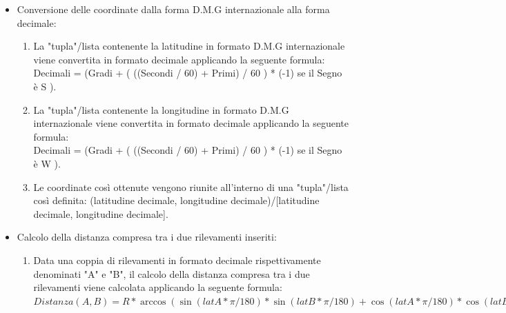 \documentclass{article}
\begin{document}
\begin{itemize}
	\item Conversione delle coordinate dalla forma D.M.G internazionale alla forma decimale:
	\begin{enumerate}
		\item La "tupla"/lista contenente la latitudine in formato D.M.G internazionale viene convertita in formato decimale applicando la seguente formula: \\Decimali = (Gradi + ( ((Secondi / 60) + Primi) / 60 ) * (-1) se il Segno è  S ). 
		\item La "tupla"/lista contenente la longitudine in formato D.M.G internazionale viene convertita in formato decimale applicando la seguente formula: \\Decimali = (Gradi + ( ((Secondi / 60) + Primi) / 60 ) * (-1) se il Segno è  W ).
		\item Le coordinate così ottenute vengono riunite all'interno di una "tupla"/lista così definita: (latitudine decimale, longitudine decimale)/[latitudine decimale, longitudine decimale].
	\end{enumerate}

	\item Calcolo della distanza compresa tra i due rilevamenti inseriti: 
	\begin{enumerate}
		\item Data una coppia di rilevamenti in formato decimale rispettivamente denominati "A" e "B", il calcolo della distanza compresa tra i due rilevamenti viene calcolata applicando la seguente formula: \\$Distanza(A, B) = R * \arccos(\sin(latA * \pi / 180) * \sin(latB * \pi / 180) + \cos(latA * \pi / 180) * \cos(latB * \pi / 180) * \cos((lonA - lonB) * \pi / 180)). $
	\end{enumerate}


\end{itemize}
\end{document}
